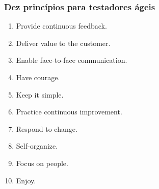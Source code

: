 \documentclass[
	12pt,				%
	openright,			%
	oneside,			%
	a4paper,			%
	english,			%
	brazil,				%
	]{abntex2}
\begin{document}
\subsubsection{Dez princípios para testadores ágeis}
\begin{enumerate}
    \item Provide continuous feedback.
    \item Deliver value to the customer.
    \item Enable face-to-face communication.
    \item Have courage.
    \item Keep it simple.
    \item Practice continuous improvement.
    \item Respond to change.
    \item Self-organize.
    \item Focus on people.
    \item Enjoy.
\end{enumerate}




\end{document}
